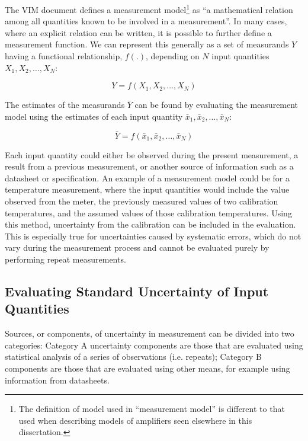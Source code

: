 \documentclass[../thesis/thesis.tex]{subfiles}
\begin{document}
\begin{refsection}
The VIM document \cite{VIM} defines a measurement model\footnote{The definition of model used in ``measurement model'' is different to that used when describing models of amplifiers seen elsewhere in this dissertation.} as ``a mathematical relation among all  quantities known to be involved in a measurement''. In many cases, where an explicit relation can be written, it is possible to further define a measurement function. We can represent this generally as a set of measurands $Y$ having a functional relationship, $f(.)$, depending on $N$ input quantities $X_1, X_2, \dots, X_N$:

\begin{equation}
Y=f(X_1,X_2,\dots,X_N)
\end{equation}

The estimates of the measurands $\bar{Y}$ can be found by evaluating the measurement model using the estimates of each input quantity $\bar{x}_1,\bar{x}_2,\dots,\bar{x}_N$:

\begin{equation}
\bar{Y}=f(\bar{x}_1,\bar{x}_2,\dots,\bar{x}_N)
\end{equation}

Each input quantity could either be observed during the present measurement, a result from a previous measurement, or another source of information such as a datasheet or specification. An example of a measurement model could be for a temperature measurement, where the input quantities would include the value observed from the meter, the previously measured values of two calibration temperatures, and the assumed values of those calibration temperatures. Using this method, uncertainty from the calibration can be included in the evaluation. This is especially true for uncertainties caused by systematic errors, which do not vary during the measurement process and cannot be evaluated purely by performing repeat measurements.

\subsection{Evaluating Standard Uncertainty of Input Quantities}

Sources, or components, of uncertainty in measurement can be divided into two categories: Category A uncertainty components are those that are evaluated using statistical analysis of a series of observations (i.e. repeats); Category B components are those that are evaluated using other means, for example using information from datasheets.


\end{refsection}
\end{document}
